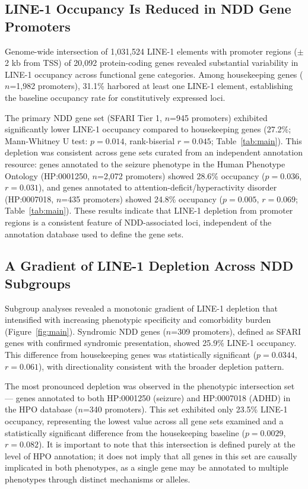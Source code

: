 \documentclass[preprints,briefreport,submit,pdftex,oneauthor]{Definitions/mdpi}
\newcommand{\Fig}[1]{Figure~\ref{#1}}
\newcommand{\Tab}[1]{Table~\ref{#1}}
\begin{document}
\subsection{LINE-1 Occupancy Is Reduced in NDD Gene Promoters}

Genome-wide intersection of 1,031,524 LINE-1 elements with
promoter regions ($\pm$2 kb from TSS) of 20,092 protein-coding
genes revealed substantial variability in LINE-1 occupancy
across functional gene categories. Among housekeeping genes
($n$=1,982 promoters), 31.1\% harbored at least one LINE-1
element, establishing the baseline occupancy rate for
constitutively expressed loci.

The primary NDD gene set (SFARI Tier 1, $n$=945 promoters)
exhibited significantly lower LINE-1 occupancy compared to
housekeeping genes (27.2\%; Mann-Whitney U test: $p = 0.014$,
rank-biserial $r = 0.045$; \Tab{tab:main}).
This depletion was
consistent across gene sets curated from an independent
annotation resource: genes annotated to the seizure phenotype
in the Human Phenotype Ontology (HP:0001250, $n$=2,072
promoters) showed 28.6\% occupancy ($p = 0.036$, $r = 0.031$),
and genes annotated to attention-deficit/hyperactivity
disorder (HP:0007018, $n$=435 promoters) showed 24.8\%
occupancy ($p = 0.005$, $r = 0.069$; \Tab{tab:main}).
These results indicate that LINE-1 depletion from promoter
regions is a consistent feature of NDD-associated loci,
independent of the annotation database used to define the
gene sets.

\subsection{A Gradient of LINE-1 Depletion Across NDD Subgroups}

Subgroup analyses revealed a monotonic gradient of LINE-1
depletion that intensified with increasing phenotypic
specificity and comorbidity burden (\Fig{fig:main}).
Syndromic NDD genes ($n$=309 promoters), defined as SFARI
genes with confirmed syndromic presentation, showed 25.9\%
LINE-1 occupancy. This difference from housekeeping genes
was statistically significant ($p = 0.0344$, $r = 0.061$),
with directionality consistent with the broader depletion pattern.

The most pronounced depletion was observed in the phenotypic
intersection set --- genes annotated to both HP:0001250
(seizure) and HP:0007018 (ADHD) in the HPO database
($n$=340 promoters). This set exhibited only 23.5\% LINE-1
occupancy, representing the lowest value across all gene sets
examined and a statistically significant difference from the
housekeeping baseline ($p = 0.0029$, $r = 0.082$). It is important
to note that this intersection is defined purely at the level
of HPO annotation; it does not imply that all genes in this
set are causally implicated in both phenotypes, as a single
gene may be annotated to multiple phenotypes through distinct
mechanisms or alleles.
\end{document}
